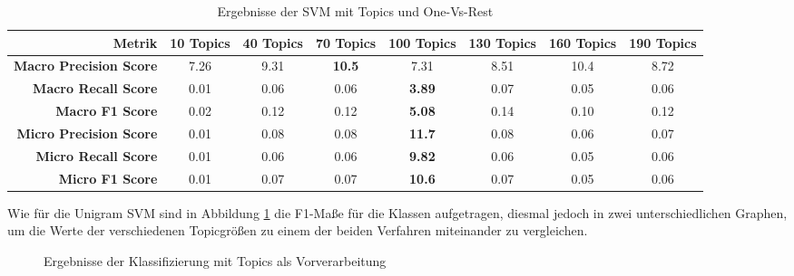 \begin{table}[h]
    \begin{tabular}{r|ccccccc}
        \tiny\textbf{Metrik} & \tiny\textbf{10 Topics} &\tiny \textbf{40 Topics} &\tiny \textbf{70 Topics} &\tiny \textbf{100 Topics} & \tiny \textbf{130 Topics} &  \tiny \textbf{160 Topics} &  \tiny \textbf{190 Topics} \\
        \hline
        \tiny \textbf{Macro Precision Score}  & \tiny 7.26& \tiny 9.31& \tiny \textbf{10.5}&\tiny 7.31&\tiny 8.51&\tiny 10.4&\tiny 8.72\\
        \tiny \textbf{Macro Recall Score}     & \tiny 0.01& \tiny 0.06& \tiny 0.06&\tiny \textbf{3.89}&\tiny 0.07&\tiny 0.05&\tiny 0.06\\
        \tiny \textbf{Macro F1 Score}        & \tiny 0.02& \tiny 0.12& \tiny 0.12&\tiny \textbf{5.08}&\tiny 0.14&\tiny 0.10&\tiny 0.12\\
        \tiny \textbf{Micro Precision Score} & \tiny 0.01& \tiny 0.08& \tiny 0.08&\tiny \textbf{11.7}&\tiny 0.08&\tiny 0.06&\tiny 0.07\\
        \tiny \textbf{Micro Recall Score}    & \tiny 0.01& \tiny 0.06& \tiny 0.06&\tiny \textbf{9.82}&\tiny 0.06&\tiny 0.05&\tiny 0.06\\
        \tiny \textbf{Micro F1 Score}        & \tiny 0.01& \tiny 0.07& \tiny 0.07&\tiny \textbf{10.6}&\tiny 0.07&\tiny 0.05&\tiny 0.06\\
    \end{tabular}
    \caption{Ergebnisse der SVM mit Topics und One-Vs-Rest}
    \label{tab:topics_svm_ovr}
\end{table}

Wie für die Unigram SVM sind in Abbildung \ref{fig:svm_topic_eval} die F1-Maße für die Klassen aufgetragen,
diesmal jedoch in zwei unterschiedlichen Graphen, um die Werte der verschiedenen Topicgrößen zu einem der beiden Verfahren miteinander
zu vergleichen.


\begin{figure}[H]
    \centering
    \def\svgwitdth{0.1\columnwidth}
    
    \caption{Ergebnisse der Klassifizierung mit Topics als Vorverarbeitung}
    \label{fig:svm_topic_eval}
\end{figure}
